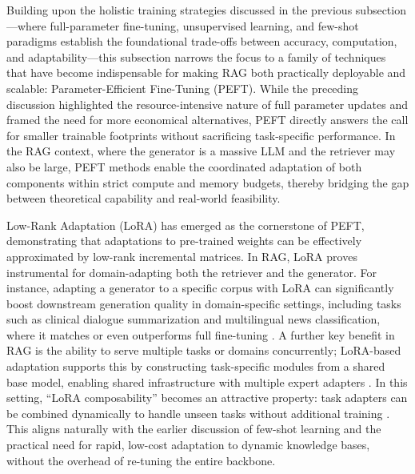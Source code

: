 \documentclass[11pt]{article}
\begin{document}
Building upon the holistic training strategies discussed in the previous subsection---where full-parameter fine-tuning, unsupervised learning, and few-shot paradigms establish the foundational trade-offs between accuracy, computation, and adaptability---this subsection narrows the focus to a family of techniques that have become indispensable for making RAG both practically deployable and scalable: Parameter-Efficient Fine-Tuning (PEFT). While the preceding discussion highlighted the resource-intensive nature of full parameter updates and framed the need for more economical alternatives, PEFT directly answers the call for smaller trainable footprints without sacrificing task-specific performance. In the RAG context, where the generator is a massive LLM and the retriever may also be large, PEFT methods enable the coordinated adaptation of both components within strict compute and memory budgets, thereby bridging the gap between theoretical capability and real-world feasibility.

Low-Rank Adaptation (LoRA) has emerged as the cornerstone of PEFT, demonstrating that adaptations to pre-trained weights can be effectively approximated by low-rank incremental matrices. In RAG, LoRA proves instrumental for domain-adapting both the retriever and the generator. For instance, adapting a generator to a specific corpus with LoRA can significantly boost downstream generation quality in domain-specific settings, including tasks such as clinical dialogue summarization and multilingual news classification, where it matches or even outperforms full fine-tuning \cite{ref206,ref207}. A further key benefit in RAG is the ability to serve multiple tasks or domains concurrently; LoRA-based adaptation supports this by constructing task-specific modules from a shared base model, enabling shared infrastructure with multiple expert adapters \cite{ref208}. In this setting, ``LoRA composability'' becomes an attractive property: task adapters can be combined dynamically to handle unseen tasks without additional training \cite{ref209,ref210}. This aligns naturally with the earlier discussion of few-shot learning and the practical need for rapid, low-cost adaptation to dynamic knowledge bases, without the overhead of re-tuning the entire backbone.
\end{document}
